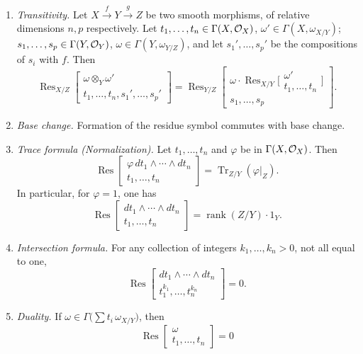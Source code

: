\begin{enumerate}
\[\]
\item[(R4)]\label{res:R4} \emph{Transitivity.} Let $X\xrightarrow{f} Y\xrightarrow{g} Z$ be two smooth morphisms, of relative dimensions $n,p$ respectively. Let $t_1,\dots,t_n\in\Gamma(X,\mathcal{O}_X)$, $\omega'\in\Gamma(X,\omega_{X/Y})$; $s_1,\dots,s_p\in\Gamma(Y,\mathcal{O}_Y)$, $\omega\in\Gamma(Y,\omega_{Y/Z})$, and let $s_1',\dots,s_p'$ be the compositions of $s_i$ with $f$. Then
\[
\operatorname{Res}_{X/Z}\begin{bmatrix} \omega\otimes_Y \omega' \\ t_1,\dots,t_n,s_1',\dots,s_p' \end{bmatrix} = \operatorname{Res}_{Y/Z}\begin{bmatrix} \omega\cdot\operatorname{Res}_{X/Y}\bigl[\begin{smallmatrix} \omega' \\ t_1,\dots,t_n \end{smallmatrix}\bigr] \\ s_1,\dots,s_p \end{bmatrix}.
\]
\item[(R5)]\label{res:R5} \emph{Base change.} Formation of the residue symbol commutes with base change.
\item[(R6)]\label{res:R6} \emph{Trace formula (Normalization).} Let $t_1,\dots,t_n$ and $\varphi$ be in $\Gamma(X,\mathcal{O}_X)$. Then
\[
\operatorname{Res}\begin{bmatrix} \varphi\,dt_1\wedge\cdots\wedge dt_n \\ t_1,\dots,t_n \end{bmatrix} = \operatorname{Tr}_{Z/Y}(\varphi|_Z).
\]
In particular, for $\varphi=1$, one has
\[
\operatorname{Res}\begin{bmatrix} dt_1\wedge\cdots\wedge dt_n \\ t_1,\dots,t_n \end{bmatrix} = \operatorname{rank}(Z/Y)\cdot 1_Y.
\]
\item[(R7)]\label{res:R7} \emph{Intersection formula.} For any collection of integers $k_1,\dots,k_n>0$, not all equal to one,
\[
\operatorname{Res}\begin{bmatrix} dt_1\wedge\cdots\wedge dt_n \\ t_1^{k_1},\dots,t_n^{k_n} \end{bmatrix} = 0.
\]
\item[(R8)]\label{res:R8} \emph{Duality.} If $\omega\in\Gamma\bigl(\sum t_i\,\omega_{X/Y}\bigr)$, then
\[
\operatorname{Res}\begin{bmatrix} \omega \\ t_1,\dots,t_n \end{bmatrix} = 0
\]
\end{enumerate}
